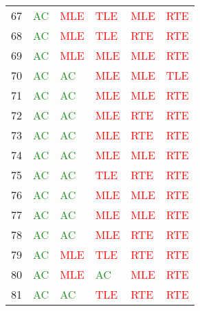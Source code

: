 \documentclass[thesis=M,english,hidelinks]{FITthesis}[2012/10/20]
\theoremstyle{definition}
\begin{document}
\begin{table}[ht]
\begin{tabular}{ m{1cm} | m{1.5cm} m{1.5cm} m{1.5cm} m{1.5cm} m{1.5cm} }
        67 & \textcolor{ForestGreen}{AC} & \textcolor{Red}{MLE} & \textcolor{Red}{TLE} & \textcolor{Red}{MLE} & \textcolor{Red}{RTE} \\
        68 & \textcolor{ForestGreen}{AC} & \textcolor{Red}{MLE} & \textcolor{Red}{TLE} & \textcolor{Red}{RTE} & \textcolor{Red}{RTE} \\
        69 & \textcolor{ForestGreen}{AC} & \textcolor{Red}{MLE} & \textcolor{Red}{MLE} & \textcolor{Red}{MLE} & \textcolor{Red}{RTE} \\
        70 & \textcolor{ForestGreen}{AC} & \textcolor{ForestGreen}{AC} & \textcolor{Red}{MLE} & \textcolor{Red}{MLE} & \textcolor{Red}{TLE} \\
        71 & \textcolor{ForestGreen}{AC} & \textcolor{ForestGreen}{AC} & \textcolor{Red}{MLE} & \textcolor{Red}{MLE} & \textcolor{Red}{RTE} \\
        72 & \textcolor{ForestGreen}{AC} & \textcolor{ForestGreen}{AC} & \textcolor{Red}{MLE} & \textcolor{Red}{RTE} & \textcolor{Red}{RTE} \\
        73 & \textcolor{ForestGreen}{AC} & \textcolor{ForestGreen}{AC} & \textcolor{Red}{MLE} & \textcolor{Red}{RTE} & \textcolor{Red}{RTE} \\
        74 & \textcolor{ForestGreen}{AC} & \textcolor{ForestGreen}{AC} & \textcolor{Red}{MLE} & \textcolor{Red}{MLE} & \textcolor{Red}{RTE} \\
        75 & \textcolor{ForestGreen}{AC} & \textcolor{ForestGreen}{AC} & \textcolor{Red}{TLE} & \textcolor{Red}{RTE} & \textcolor{Red}{RTE} \\
        76 & \textcolor{ForestGreen}{AC} & \textcolor{ForestGreen}{AC} & \textcolor{Red}{MLE} & \textcolor{Red}{MLE} & \textcolor{Red}{RTE} \\
        77 & \textcolor{ForestGreen}{AC} & \textcolor{ForestGreen}{AC} & \textcolor{Red}{MLE} & \textcolor{Red}{MLE} & \textcolor{Red}{RTE} \\
        78 & \textcolor{ForestGreen}{AC} & \textcolor{ForestGreen}{AC} & \textcolor{Red}{MLE} & \textcolor{Red}{RTE} & \textcolor{Red}{RTE} \\
        79 & \textcolor{ForestGreen}{AC} & \textcolor{Red}{MLE} & \textcolor{Red}{TLE} & \textcolor{Red}{RTE} & \textcolor{Red}{RTE} \\
        80 & \textcolor{ForestGreen}{AC} & \textcolor{Red}{MLE} & \textcolor{ForestGreen}{AC} & \textcolor{Red}{MLE} & \textcolor{Red}{RTE} \\
        81 & \textcolor{ForestGreen}{AC} & \textcolor{ForestGreen}{AC} & \textcolor{Red}{TLE} & \textcolor{Red}{RTE} & \textcolor{Red}{RTE} \\

\end{tabular}
\end{table}
\end{document}
